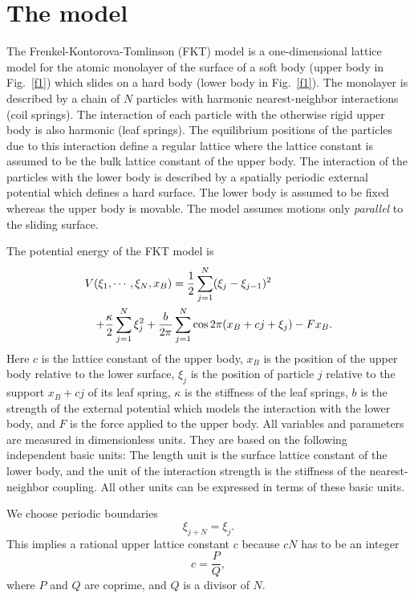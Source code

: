 \section{\protect\label{MOD}The model}

The Frenkel-Kontorova-Tomlinson (FKT) model is a one-dimensional
lattice model for the atomic monolayer of the surface of a soft body
(upper body in Fig.~\ref{f1}) which slides on a hard body (lower body
in Fig.~\ref{f1}). The monolayer is described by a chain of $N$
particles with harmonic nearest-neighbor interactions (coil springs).
The interaction of each particle with the otherwise rigid upper body
is also harmonic (leaf springs). The equilibrium positions of the
particles due to this interaction define a regular lattice where the
lattice constant is assumed to be the bulk lattice constant of the
upper body. The interaction of the particles with the lower body is
described by a spatially periodic external potential which defines a
hard surface. The lower body is assumed to be fixed whereas the upper
body is movable. The model assumes motions only {\em parallel\/} to
the sliding surface.

The potential energy of the FKT model is \begin{eqnarray}
  \lefteqn{V(\xi_1,\cdots,\xi_N,x_B)=\frac{1}{2}
    \sum_{j=1}^N(\xi_j-\xi_{j-1})^2}\nonumber\\
   &&+\frac{\kappa}{2}\sum_{j=1}^N\xi_j^2
  +\frac{b}{2\pi}\sum_{j=1}^N\cos 2\pi (x_B+cj+\xi_j)-Fx_B.
  \label{MOD.V} 
\end{eqnarray} 
Here $c$ is the lattice constant of
the upper body, $x_B$ is the position of the upper body relative to
the lower surface, $\xi_j$ is the position of particle $j$ relative
to the support $x_B+cj$ of its leaf spring, $\kappa$ is the stiffness
of the leaf springs, $b$ is the strength of the external potential
which models the interaction with the lower body, and $F$ is the
force applied to the upper body.  All variables and parameters are
measured in dimensionless units.  They are based on the following
independent basic units: The length unit is the surface lattice
constant of the lower body, and the unit of the interaction strength
is the stiffness of the nearest-neighbor coupling. All other units
can be expressed in terms of these basic units. 

We choose periodic boundaries
\begin{equation}
  \xi_{j+N}=\xi_j.
  \label{MOD.pb}
\end{equation}
This implies a rational upper lattice constant $c$ because $cN$ has
to be an integer
\begin{equation}
  c=\frac{P}{Q},
  \label{MOD.cpb}
\end{equation}
where $P$ and $Q$ are coprime, and $Q$ is a divisor of $N$.

